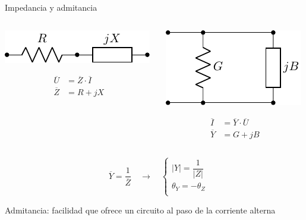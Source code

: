 \documentclass[aspectratio=169, usenames,svgnames,dvipsnames]{beamer}
\begin{document}

\begin{frame}{Impedancia y admitancia}
    \begin{columns}
    \begin{column}{0.5\columnwidth}

    \vspace{4mm}
    \begin{center}
        \includegraphics[height=0.12\textheight]{../figs/Z.pdf}
    \end{center}

    \vspace{2mm}
    \begin{align*}
      \overline{U} &= \overline{Z} \cdot \overline{I}\\
      \overline{Z} &= R + j X
    \end{align*}
    \end{column}
    
    \begin{column}{0.5\columnwidth}
    \begin{center}
        \includegraphics[height=0.25\textheight]{../figs/Y.pdf}
    \end{center}

    \vspace{-5mm}
    \begin{align*}
      \overline{I} &= \overline{Y} \cdot \overline{U}\\
      \overline{Y} &= G + j B
    \end{align*}
    \end{column}
    \end{columns}

    \vspace{5mm}
    \[
    \boxed{\quad 
      \overline{Y} = \frac{1}{\overline{Z}} \quad \rightarrow \quad \left\{%
        \begin{array}{l}
          |Y| = \dfrac{1}{|Z|}\\[12pt]
          \theta_Y = -\theta_Z \\
          \end{array}\right.
          }
    \]

    \alert{Admitancia}: facilidad que ofrece un circuito al paso de la corriente alterna 
\end{frame}
\end{document}
